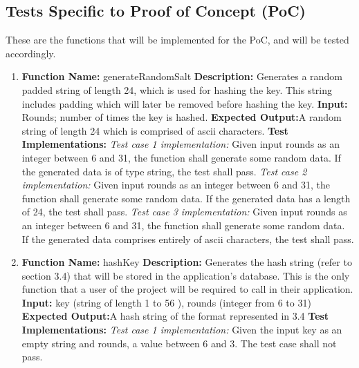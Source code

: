 \documentclass[12pt]{article}
\begin{document}
\subsection{Tests Specific to Proof of Concept (PoC)}
These are the functions that will be implemented for the PoC, and will be tested accordingly.
  \begin{enumerate}
  \item
  \textbf{Function Name:} generateRandomSalt \newline
  \textbf{Description:} Generates a random padded string of length 24, which is used for hashing the key. This string includes padding which will later be removed before hashing the key.\newline
  \textbf{Input:} Rounds; number of times the key is hashed.\newline
  \textbf{Expected Output:}A random string of length 24 which is comprised of ascii characters.\newline
  \textbf{Test Implementations:} \newline
  \textit{Test case 1 implementation:} Given input rounds as an integer between 6 and 31, the function shall generate some random data. If the generated data is of type string, the test shall pass. \newline
  \textit{Test case 2 implementation:} Given input rounds as an integer between 6 and 31, the function shall generate some random data. If the generated data has a length of 24, the test shall pass. \newline
  \textit{Test case 3 implementation:} Given input rounds as an integer between 6 and 31, the function shall generate some random data. If the generated data comprises entirely of ascii characters, the test shall pass. \newline
  \item
  \textbf{Function Name:} hashKey \newline
  \textbf{Description:} Generates the hash string (refer to section 3.4)  that will be stored in the application’s database. This is the only function that a user of the project will be required to call in their application. \newline
  \textbf{Input:} key (string of length 1 to 56 ), rounds (integer from 6 to 31) \newline
  \textbf{Expected Output:}A hash string of the format represented in 3.4 \newline
  \textbf{Test Implementations:} \newline
  \textit{Test case 1 implementation:} Given the input  key as an empty string and rounds, a value between 6 and 3. The test case shall not pass. \newline

\end{enumerate}
\end{document}

